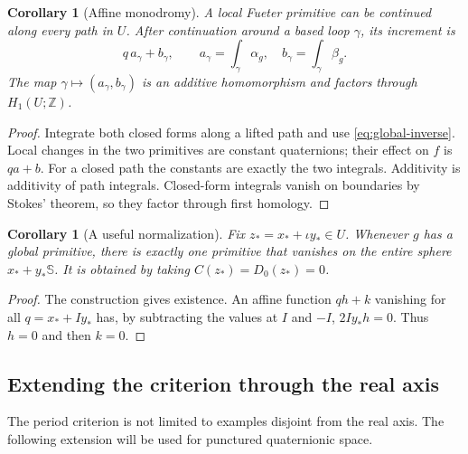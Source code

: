 \documentclass[11pt,a4paper]{article}
\numberwithin{equation}{section}
\newtheorem{corollary}[theorem]{Corollary}
\theoremstyle{definition}
\theoremstyle{remark}
\newcommand{\SSS}{\mathbb S}
\newcommand{\Z}{\mathbb Z}
\begin{document}
\begin{corollary}[Affine monodromy]\label{cor:monodromy}
A local Fueter primitive can be continued along every path in $U$.
After continuation around a based loop $\gamma$, its increment is
\begin{equation}\label{eq:monodromy}
 q\,a_\gamma+b_\gamma,\qquad
 a_\gamma=\int_\gamma\alpha_g,\quad
 b_\gamma=\int_\gamma\beta_g.
\end{equation}
The map $\gamma\mapsto(a_\gamma,b_\gamma)$ is an additive homomorphism
and factors through $H_1(U;\Z)$.
\end{corollary}
\begin{proof}
Integrate both closed forms along a lifted path and use
\eqref{eq:global-inverse}. Local changes in the two primitives are constant
quaternions; their effect on $f$ is $qa+b$. For a closed path the constants
are exactly the two integrals. Additivity is additivity of path integrals.
Closed-form integrals vanish on boundaries by Stokes' theorem, so they
factor through first homology.
\end{proof}

\begin{corollary}[A useful normalization]\label{cor:normalization}
Fix $z_*=x_*+\iota y_*\in U$. Whenever $g$ has a global primitive,
there is exactly one primitive that vanishes on the entire sphere
$x_*+y_*\SSS$. It is obtained by taking $C(z_*)=D_0(z_*)=0$.
\end{corollary}
\begin{proof}
The construction gives existence. An affine function $qh+k$ vanishing
for all $q=x_*+Iy_*$ has, by subtracting the values at $I$ and $-I$,
$2Iy_*h=0$. Thus $h=0$ and then $k=0$.
\end{proof}

\subsection{Extending the criterion through the real axis}
The period criterion is not limited to examples disjoint from the real
axis. The following extension will be used for punctured quaternionic
space.
\end{document}
